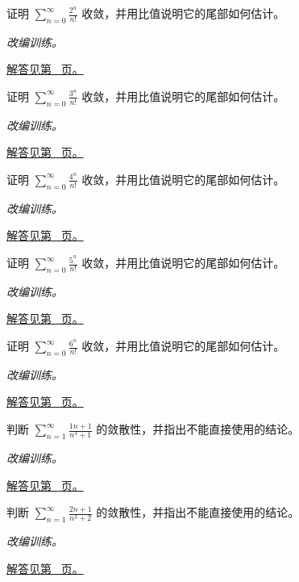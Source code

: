 \documentclass[12pt,fontset=fandol]{ctexart}
\begin{document}
\begin{example}[阶乘压过指数]\label{ex:c24q14}
证明 $\displaystyle\sum_{n=0}^\infty\frac{2^n}{n!}$ 收敛，并用比值说明它的尾部如何估计。
\par\textit{改编训练。}\par\hyperref[ans:c24q14]{解答见第~\pageref{ans:c24q14} 页。}
\end{example}
\begin{example}[阶乘压过指数]\label{ex:c24q15}
证明 $\displaystyle\sum_{n=0}^\infty\frac{3^n}{n!}$ 收敛，并用比值说明它的尾部如何估计。
\par\textit{改编训练。}\par\hyperref[ans:c24q15]{解答见第~\pageref{ans:c24q15} 页。}
\end{example}
\begin{example}[阶乘压过指数]\label{ex:c24q16}
证明 $\displaystyle\sum_{n=0}^\infty\frac{4^n}{n!}$ 收敛，并用比值说明它的尾部如何估计。
\par\textit{改编训练。}\par\hyperref[ans:c24q16]{解答见第~\pageref{ans:c24q16} 页。}
\end{example}
\begin{example}[阶乘压过指数]\label{ex:c24q17}
证明 $\displaystyle\sum_{n=0}^\infty\frac{5^n}{n!}$ 收敛，并用比值说明它的尾部如何估计。
\par\textit{改编训练。}\par\hyperref[ans:c24q17]{解答见第~\pageref{ans:c24q17} 页。}
\end{example}
\begin{example}[阶乘压过指数]\label{ex:c24q18}
证明 $\displaystyle\sum_{n=0}^\infty\frac{6^n}{n!}$ 收敛，并用比值说明它的尾部如何估计。
\par\textit{改编训练。}\par\hyperref[ans:c24q18]{解答见第~\pageref{ans:c24q18} 页。}
\end{example}
\begin{example}[极限比较与主导次数]\label{ex:c24q19}
判断 $\displaystyle\sum_{n=1}^\infty\frac{1n+1}{n^3+1}$ 的敛散性，并指出不能直接使用的结论。
\par\textit{改编训练。}\par\hyperref[ans:c24q19]{解答见第~\pageref{ans:c24q19} 页。}
\end{example}
\begin{example}[极限比较与主导次数]\label{ex:c24q20}
判断 $\displaystyle\sum_{n=1}^\infty\frac{2n+1}{n^3+2}$ 的敛散性，并指出不能直接使用的结论。
\par\textit{改编训练。}\par\hyperref[ans:c24q20]{解答见第~\pageref{ans:c24q20} 页。}
\end{example}
\end{document}
